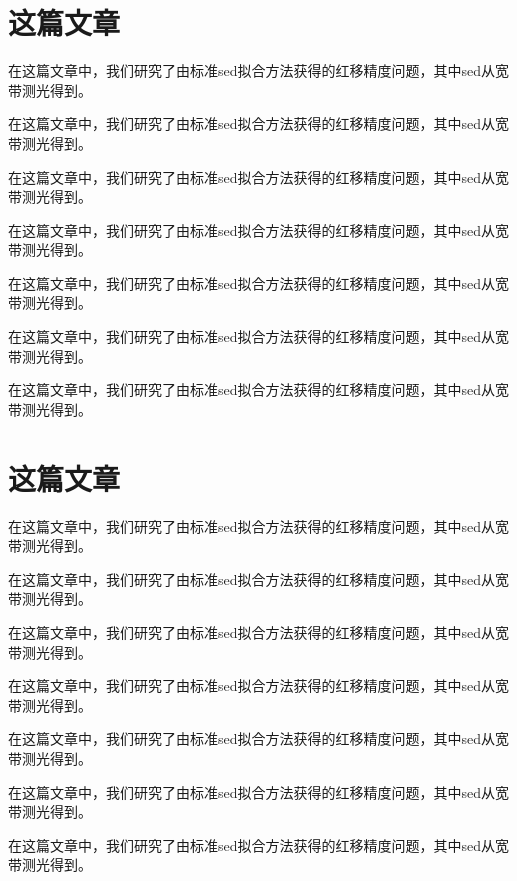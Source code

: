 
\section{这篇文章}
 
在这篇文章中，我们研究了由标准sed拟合方法获得的红移精度问题，其中sed从宽带测光得到。

{ \kaishu 在这篇文章中，我们研究了由标准sed拟合方法获得的红移精度问题，其中sed从宽带测光得到。}

{ \heiti 在这篇文章中，我们研究了由标准sed拟合方法获得的红移精度问题，其中sed从宽带测光得到。}

{ \songti 在这篇文章中，我们研究了由标准sed拟合方法获得的红移精度问题，其中sed从宽带测光得到。}

{ \fangsong 在这篇文章中，我们研究了由标准sed拟合方法获得的红移精度问题，其中sed从宽带测光得到。}

{ \lishu 在这篇文章中，我们研究了由标准sed拟合方法获得的红移精度问题，其中sed从宽带测光得到。}

{ \youyuan 在这篇文章中，我们研究了由标准sed拟合方法获得的红移精度问题，其中sed从宽带测光得到。}

\section{这篇文章}
 
在这篇文章中，我们研究了由标准sed拟合方法获得的红移精度问题，其中sed从宽带测光得到。

{ \kaishu 在这篇文章中，我们研究了由标准sed拟合方法获得的红移精度问题，其中sed从宽带测光得到。}

{ \heiti 在这篇文章中，我们研究了由标准sed拟合方法获得的红移精度问题，其中sed从宽带测光得到。}

{ \songti 在这篇文章中，我们研究了由标准sed拟合方法获得的红移精度问题，其中sed从宽带测光得到。}

{ \fangsong 在这篇文章中，我们研究了由标准sed拟合方法获得的红移精度问题，其中sed从宽带测光得到。}

{ \lishu 在这篇文章中，我们研究了由标准sed拟合方法获得的红移精度问题，其中sed从宽带测光得到。}

{ \youyuan 在这篇文章中，我们研究了由标准sed拟合方法获得的红移精度问题，其中sed从宽带测光得到。}

